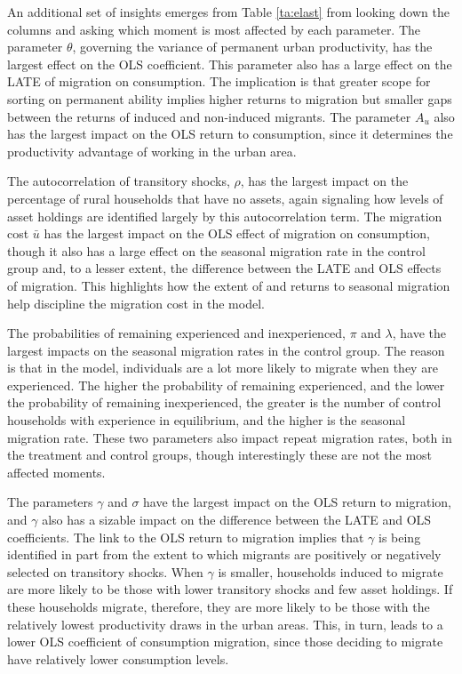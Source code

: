 \documentclass[12pt,pdftex]{article}
\begin{document}
An additional set of insights emerges from Table \ref{ta:elast} from looking down the columns and asking which moment is most affected by each parameter. The parameter $\theta$, governing the variance of permanent urban productivity, has the largest effect on the OLS coefficient. This parameter also has a large effect on the LATE of migration on consumption. The implication is that greater scope for sorting on permanent ability implies higher returns to migration but smaller gaps between the returns of induced and non-induced migrants. The parameter $A_u$ also has the largest impact on the OLS return to consumption, since it determines the productivity advantage of working in the urban area.

The autocorrelation of transitory shocks, $\rho$, has the largest impact on the percentage of rural households that have no assets, again signaling how levels of asset holdings are identified largely by this autocorrelation term. The migration cost $\bar u$ has the largest impact on the OLS effect of migration on consumption, though it also has a large effect on the seasonal migration rate in the control group and, to a lesser extent, the difference between the LATE and OLS effects of migration. This highlights how the extent of and returns to seasonal migration help discipline the migration cost in the model.

The probabilities of remaining experienced and inexperienced, $\pi$ and $\lambda$, have the largest impacts on the seasonal migration rates in the control group. The reason is that in the model, individuals are a lot more likely to migrate when they are experienced. The higher the probability of remaining experienced, and the lower the probability of remaining inexperienced, the greater is the number of control households with experience in equilibrium, and the higher is the seasonal migration rate. These two parameters also impact repeat migration rates, both in the treatment and control groups, though interestingly these are not the most affected moments.

The parameters $\gamma$ and $\sigma$ have the largest impact on the OLS return to migration, and $\gamma$ also has a sizable impact on the difference between the LATE and OLS coefficients. The link to the OLS return to migration implies that $\gamma$ is being identified in part from the extent to which migrants are positively or negatively selected on transitory shocks. When $\gamma$ is smaller, households induced to migrate are more likely to be those with lower transitory shocks and few asset holdings. If these households migrate, therefore, they are more likely to be those with the relatively lowest productivity draws in the urban areas. This, in turn, leads to a lower OLS coefficient of consumption migration, since those deciding to migrate have relatively lower consumption levels.
\end{document}
